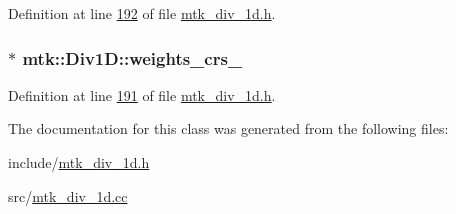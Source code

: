 Definition at line \hyperlink{mtk__div__1d_8h_source_l00192}{192} of file \hyperlink{mtk__div__1d_8h_source}{mtk\-\_\-div\-\_\-1d.\-h}.

\hypertarget{classmtk_1_1Div1D_ad36dcfade921f0488fe3edaecc17bd75}{
\subsubsection[{weights\-\_\-crs\-\_\-}]{$\ast$ mtk\-::\-Div1\-D\-::weights\-\_\-crs\-\_\-\hspace{0.3cm}{\ttfamily [private]}}}\label{classmtk_1_1Div1D_ad36dcfade921f0488fe3edaecc17bd75}


Definition at line \hyperlink{mtk__div__1d_8h_source_l00191}{191} of file \hyperlink{mtk__div__1d_8h_source}{mtk\-\_\-div\-\_\-1d.\-h}.



The documentation for this class was generated from the following files\-:\begin{DoxyCompactItemize}
\item 
include/\hyperlink{mtk__div__1d_8h}{mtk\-\_\-div\-\_\-1d.\-h}\item 
src/\hyperlink{mtk__div__1d_8cc}{mtk\-\_\-div\-\_\-1d.\-cc}\end{DoxyCompactItemize}
